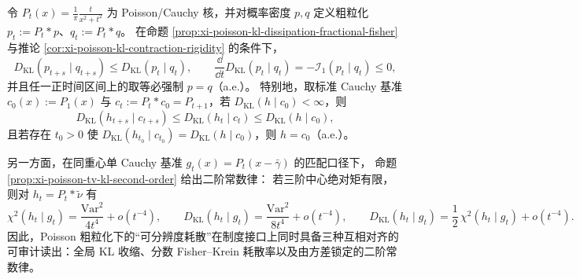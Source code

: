 
\begin{conclusion}\label{con:xi-poisson-distinguishability-trinity}
令 \(P_t(x)=\frac{1}{\pi}\frac{t}{x^2+t^2}\) 为 Poisson/Cauchy 核，并对概率密度 \(p,q\) 定义粗粒化 \(p_t:=P_t*p\)、\(q_t:=P_t*q\)。
在命题 \ref{prop:xi-poisson-kl-dissipation-fractional-fisher} 与推论 \ref{cor:xi-poisson-kl-contraction-rigidity} 的条件下，
\[
D_{\mathrm{KL}}(p_{t+s}\mid q_{t+s})\le D_{\mathrm{KL}}(p_t\mid q_t),
\qquad
\frac{\dd}{\dd t}D_{\mathrm{KL}}(p_t\mid q_t)=-\mathcal I_1(p_t\mid q_t)\le 0,
\]
并且任一正时间区间上的取等必强制 \(p=q\)（a.e.）。
特别地，取标准 Cauchy 基准 \(c_0(x):=P_1(x)\) 与 \(c_t:=P_t*c_0=P_{t+1}\)，若 \(D_{\mathrm{KL}}(h\mid c_0)<\infty\)，则
\[
D_{\mathrm{KL}}(h_{t+s}\mid c_{t+s})\le D_{\mathrm{KL}}(h_t\mid c_t)\le D_{\mathrm{KL}}(h\mid c_0),
\]
且若存在 \(t_0>0\) 使 \(D_{\mathrm{KL}}(h_{t_0}\mid c_{t_0})=D_{\mathrm{KL}}(h\mid c_0)\)，则 \(h=c_0\)（a.e.）。
\par
另一方面，在同重心单 Cauchy 基准 \(g_t(x)=P_t(x-\bar\gamma)\) 的匹配口径下，
命题 \ref{prop:xi-poisson-tv-kl-second-order} 给出二阶常数律：
若三阶中心绝对矩有限，则对 \(h_t=P_t*\tilde\nu\) 有
\[
\chi^2(h_t\mid g_t)=\frac{\mathrm{Var}^2}{4t^4}+o(t^{-4}),
\qquad
D_{\mathrm{KL}}(h_t\mid g_t)=\frac{\mathrm{Var}^2}{8t^4}+o(t^{-4}),
\qquad
D_{\mathrm{KL}}(h_t\mid g_t)=\frac12\,\chi^2(h_t\mid g_t)+o(t^{-4}).
\]
因此，Poisson 粗粒化下的“可分辨度耗散”在制度接口上同时具备三种互相对齐的可审计读出：全局 KL 收缩、分数 Fisher--Krein 耗散率以及由方差锁定的二阶常数律。
\end{conclusion}

\endinput
